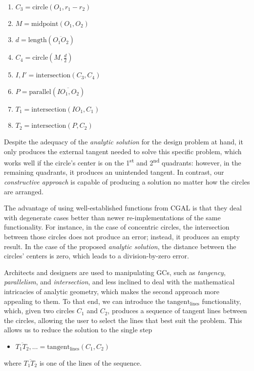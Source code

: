 \begin{enumerate}
  \item $C_3 = \mathrm{circle}\left(O_1, r_1 - r_2\right)$
  \item $M = \mathrm{midpoint}\left(O_1, O_2\right)$
  \item $d = \mathrm{length}\left(\overline{O_1 O_2}\right)$
  \item $C_4 = \mathrm{circle}\left(M, \frac{d}{2}\right)$
  \item $I,I' = \mathrm{intersection}\left(C_3, C_4\right)$
  \item $P = \mathrm{parallel}\left(\overline{IO_1, O_2}\right)$
  \item $T_1 = \mathrm{intersection}\left(IO_1, C_1\right)$
  \item $T_2 = \mathrm{intersection}\left(P, C_2\right)$
\end{enumerate}

Despite the adequacy of the \textit{analytic solution} for the design problem at
hand, it only produces the external tangent needed to solve this specific
problem, which works well if the circle's center is on the 1\textsuperscript{st}
and 2\textsuperscript{nd} quadrants: however, in the remaining quadrants, it
produces an unintended tangent.  In contrast, our \textit{constructive approach}
is capable of producing a solution no matter how the circles are arranged.

The advantage of using well-established functions from \ac{CGAL} is that they
deal with degenerate cases better than newer re-implementations of the same
functionality.  For instance, in the case of concentric circles, the
intersection between those circles does not produce an error; instead, it
produces an empty result.  In the case of the proposed \textit{analytic
solution}, the distance between the circles' centers is zero, which leads to a
division-by-zero error.

Architects and designers are used to manipulating \acp{GC}, such as
\textit{tangency}, \textit{parallelism}, and \textit{intersection}, and less
inclined to deal with the mathematical intricacies of analytic geometry, which
makes the second approach more appealing to them.  To that end, we can introduce
the $\mathrm{tangent_{lines}}$ functionality, which, given two circles $C_1$ and
$C_2$, produces a sequence of tangent lines between the circles, allowing the
user to select the lines that best suit the problem.  This allows us to reduce
the solution to the single step
\begin{itemize}
  \item[] $\overline{T_1 T_2},\ldots = \mathrm{tangent_{lines}}\left(C_1,
  C_2\right)$
\end{itemize}
where $\overline{T_1 T_2}$ is one of the lines of the sequence.

